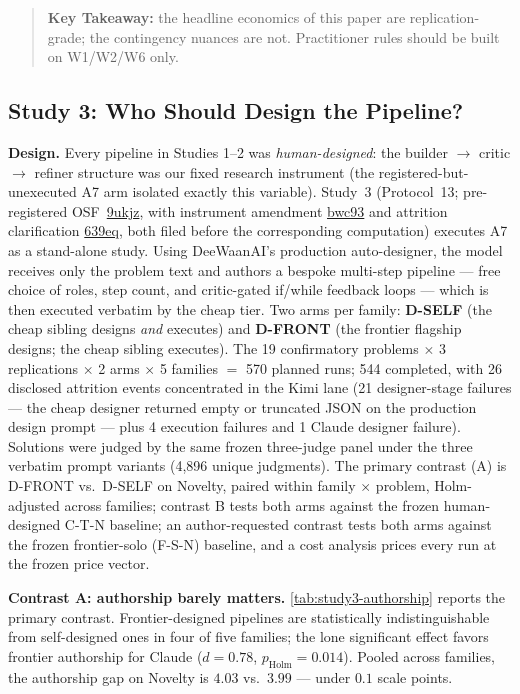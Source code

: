 \documentclass[12pt,a4paper]{article}
\begin{document}
\begin{quote}
\textbf{Key Takeaway:} the headline economics of this paper are
replication-grade; the contingency nuances are not. Practitioner rules should
be built on W1/W2/W6 only.
\end{quote}

\subsection{Study 3: Who Should Design the Pipeline?}\label{sec:study3}

\textbf{Design.} Every pipeline in Studies 1--2 was \emph{human-designed}: the
builder $\to$ critic $\to$ refiner structure was our fixed research instrument
(the registered-but-unexecuted A7 arm isolated exactly this variable).
Study~3 (Protocol~13; pre-registered OSF~\href{https://osf.io/9ukjz}{9ukjz},
with instrument amendment \href{https://osf.io/bwc93}{bwc93} and attrition
clarification \href{https://osf.io/639eq}{639eq}, both filed before the
corresponding computation) executes A7 as a stand-alone study. Using
DeeWaanAI's production auto-designer, the model receives only the problem text and authors
a bespoke multi-step pipeline --- free choice of roles, step count, and
critic-gated if/while feedback loops --- which is then executed verbatim by
the cheap tier. Two arms per family: \textbf{D-SELF} (the cheap sibling
designs \emph{and} executes) and \textbf{D-FRONT} (the frontier flagship
designs; the cheap sibling executes). The 19 confirmatory problems
$\times$ 3 replications $\times$ 2 arms $\times$ 5 families $=$ 570 planned
runs; 544 completed, with 26 disclosed attrition events concentrated in the
Kimi lane (21 designer-stage failures --- the cheap designer returned empty or
truncated JSON on the production design prompt --- plus 4 execution failures
and 1 Claude designer failure). Solutions were judged by the same frozen
three-judge panel under the three verbatim prompt variants (4{,}896 unique
judgments). The primary contrast (A) is D-FRONT vs.\ D-SELF on Novelty, paired
within family $\times$ problem, Holm-adjusted across families; contrast B tests
both arms against the frozen human-designed C-T-N baseline; an author-requested
contrast tests both arms against the frozen frontier-solo (F-S-N) baseline, and
a cost analysis prices every run at the frozen price vector.

\textbf{Contrast A: authorship barely matters.}
\cref{tab:study3-authorship} reports the primary contrast. Frontier-designed
pipelines are statistically indistinguishable from self-designed ones in four
of five families; the lone significant effect favors frontier authorship for
Claude ($d = 0.78$, $p_{\text{Holm}} = 0.014$). Pooled across families, the
authorship gap on Novelty is $4.03$ vs.\ $3.99$ --- under $0.1$ scale points.
\end{document}
